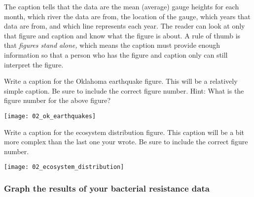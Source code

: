 \documentclass[12pt, hidelinks]{exam}
\begin{document}
\begin{questions}
\vspace{0.5\baselineskip}

The caption tells that the data are the mean (average) gauge heights for 
each month, which river the data are from, the location of the
gauge, which years that data are from, and which line represents each 
year. The reader can look at only that figure and caption and know what
the figure is about. A rule of thumb is that \emph{figures stand alone,} which means 
the caption must provide enough information so that a person who 
has the figure and caption only can still interpret the figure. 




\question
Write a caption for the Oklahoma earthquake figure. This will be 
a relatively simple caption. Be sure to include the correct figure 
number. Hint: What is the figure number for the above figure?

\hfil%
\begin{minipage}{0.7\textwidth}
	\texttt{[image: 02\_ok\_earthquakes]}\\
	
	\vspace{0.15\textheight}

	
\end{minipage}%
\hfil


\question
Write a caption for the ecosystem distribution figure. This
caption will be a bit more complex than the last one your wrote.
Be sure to include  the correct figure number.

\hfil%
\begin{minipage}{0.7\textwidth}
	\texttt{[image: 02\_ecosystem\_distribution]}\\
	
	
\end{minipage}%
\hfil



\subsubsection*{Graph the results of your bacterial resistance data}


\end{questions}
\end{document}
